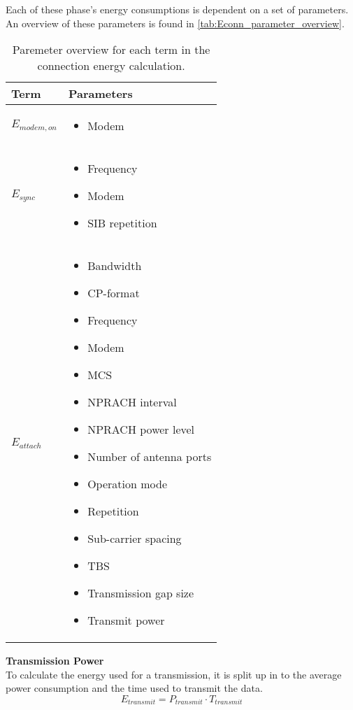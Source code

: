 Each of these phase's energy consumptions is dependent on a set of parameters. An overview of these parameters is found in \autoref{tab:Econn_parameter_overview}.

\begin{table}[H]
\centering
\begin{tabular}{|m{3cm}|m{6cm}|} \hline
\textbf{Term} & \textbf{Parameters} \\ \hline
$E_{modem,on}$ & \begin{itemize} 
\item Modem
\end{itemize} \\ \hline
$E_{sync}$ & \begin{itemize}
\item Frequency
\item Modem
\item SIB repetition
\end{itemize} \\ \hline
$E_{attach}$ & \begin{itemize}
\item Bandwidth
\item \gls{CP}-format
\item Frequency
\item Modem 
\item \gls{MCS}
\item NPRACH interval
\item NPRACH power level
\item Number of antenna ports
\item Operation mode
\item Repetition
\item Sub-carrier spacing
\item \gls{TBS}
\item Transmission gap size
\item Transmit power
\end{itemize} \\ \hline
\end{tabular}
\caption{Paremeter overview for each term in the connection energy calculation.}
\label{tab:Econn_parameter_overview}
\end{table}



\textbf{Transmission Power}\\
To calculate the energy used for a transmission, it is split up in to the average power consumption and the time used to transmit the data. 
\begin{equation}
E_{transmit} = P_{transmit}\cdot T_{transmit}
\end{equation}
\begin{where}
\end{where}

